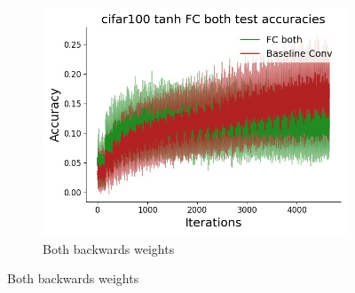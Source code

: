 \begin{figure}[htb]
\begin{subfigure}{0.25\textwidth}
  \includegraphics[width=\linewidth]{chapter_6_figures/AR/cifar100_tanh_FC_both_test_accuracies_prelim_1.jpg}
  \caption{Both backwards weights}
\end{subfigure}


\end{figure}
